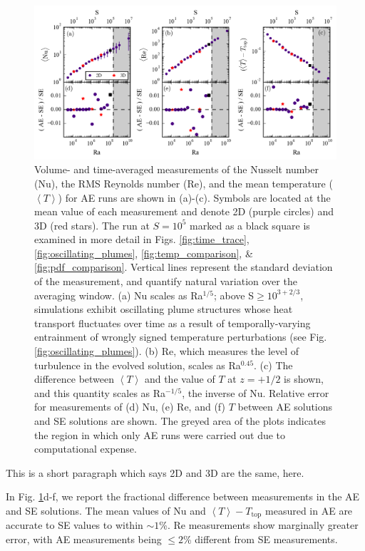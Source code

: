 \documentclass[aps, pre, onecolumn, nofootinbib, notitlepage, groupedaddress, amsfonts, amssymb, amsmath, longbibliography]{revtex4-1}
\newcommand{\angles}[1]{\ensuremath{\left\langle #1 \right\rangle}}
\begin{document}
\begin{figure}[b]
\includegraphics[width=\textwidth]{./figs/parameter_space_comparison.png}
\caption{Volume- and time-averaged measurements of the Nusselt number (Nu), the
RMS Reynolds number (Re), and the mean temperature ($\angles{T}$) for AE runs are shown in (a)-(c).
Symbols are located at the mean value of
each measurement and denote 2D (purple circles) and 3D (red stars). 
The run at $S = 10^5$ marked as a
black square is examined in more detail in Figs. \ref{fig:time_trace}, \ref{fig:oscillating_plumes},
\ref{fig:temp_comparison}, \& \ref{fig:pdf_comparison}.
Vertical lines represent the standard deviation of the measurement,
and quantify natural variation over the averaging window. 
(a) Nu scales as Ra$^{1/5}$; above S$\geq 10^{3+2/3}$,
simulations exhibit oscillating plume structures whose heat transport fluctuates over time
as a result of temporally-varying entrainment of wrongly signed temperature perturbations
(see Fig. \ref{fig:oscillating_plumes}).  
(b) Re, which measures the level of turbulence in the evolved solution, scales as
Ra$^{0.45}$. (c) The difference between $\angles{T}$ and the value of $T$ at $z = +1/2$
is shown, and this quantity scales as Ra$^{-1/5}$, the inverse of Nu.
Relative error for measurements of (d) Nu, (e) Re, and (f) $T$ between 
AE solutions and SE solutions are shown.
The greyed area of the plots indicates the region in which only AE runs were
carried out due to computational expense. \label{fig:parameter_space_comparison} }
\end{figure}


This is a short paragraph which says 2D and 3D are the same, here.

In Fig. \ref{fig:parameter_space_comparison}d-f, we report the fractional difference
between measurements in the AE and SE solutions.
The mean values of Nu and $\angles{T} - T_{\text{top}}$ 
measured in AE are accurate to SE values to within $\sim 1$\%.
Re measurements show marginally greater error, with AE measurements being 
$\leq 2$\% different from SE measurements.
\end{document}
